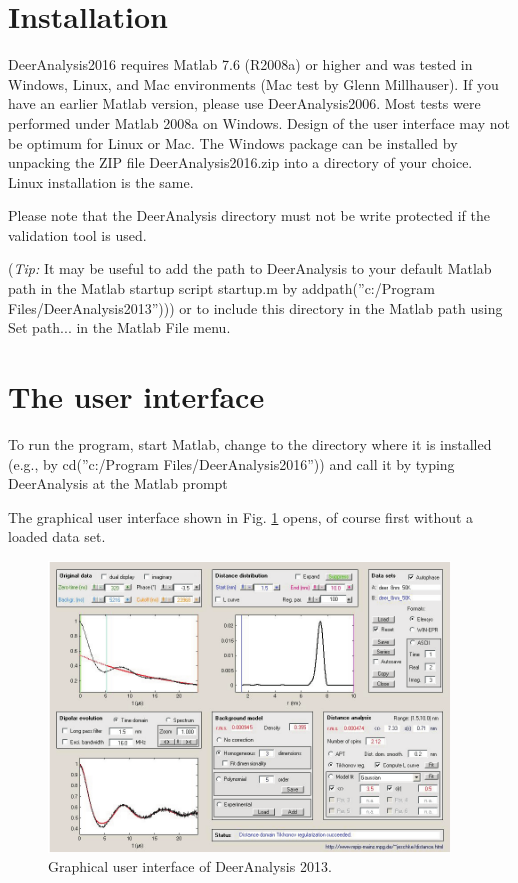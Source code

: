 \documentclass{article}
\begin{document}
\section{Installation}
\label{install}

DeerAnalysis2016 requires Matlab 7.6 (R2008a) or higher and was tested in Windows, Linux, and Mac
environments (Mac test by Glenn Millhauser). If you have an earlier Matlab version, please use DeerAnalysis2006. Most tests were performed under Matlab 2008a on Windows. Design of the user interface may not be optimum for Linux or Mac. The
Windows package can be installed by unpacking the ZIP file DeerAnalysis2016.zip into a directory of your choice. Linux installation is the same. 

Please note that the DeerAnalysis directory must not be write protected if the validation tool is used.

({\em Tip:} It may be useful to add the path to DeerAnalysis to your default Matlab path in the Matlab startup script {\ttfamily startup.m} by {\ttfamily addpath(''c:/Program Files/DeerAnalysis2013''))}) or to include this directory in the Matlab path using {\ttfamily Set path...} in the Matlab File menu.

\section{The user interface}
\label{features}

To run the program, start Matlab, change to the directory where it is installed
(e.g., by {\ttfamily cd(''c:/Program Files/DeerAnalysis2016''))} and call it by typing
{\ttfamily DeerAnalysis} at the Matlab prompt  

The graphical user interface shown in Fig. \ref{fig:manfig1} opens, of course first without a loaded data set.

\begin{figure}[ht]
 	\begin{center}
  \includegraphics[width=0.95\textwidth]{fig1.pdf}
	\end{center}
	\caption{Graphical user interface of DeerAnalysis 2013.}
	\label{fig:manfig1}
\end{figure}
\end{document}
